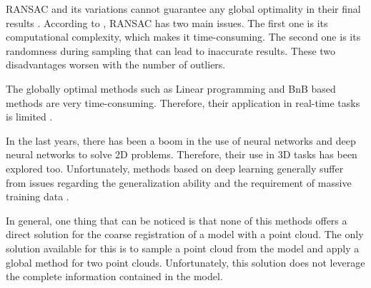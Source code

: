    RANSAC and its variations cannot guarantee any global optimality in their final results \cite{Bazin_2013_abranchandbound}.
    According to \cite{Quan_2020_com}, RANSAC has two main issues. 
    The first one is its computational complexity, which makes it time-consuming.
    The second one is its randomness during sampling that can lead to inaccurate results.
    These two disadvantages worsen with the number of outliers.

    The globally optimal methods such as Linear programming and BnB based methods are very time-consuming. 
    Therefore, their application in real-time tasks is limited \cite{Sarode_2019_oneframework}.

    In the last years, there has been a boom in the use of neural networks and deep neural networks to solve 2D problems.
    Therefore, their use in 3D tasks has been explored too.
    Unfortunately, methods based on deep learning generally suffer from issues regarding the generalization ability and the requirement of massive training data \cite{Quan_2020_com}.

    In general, one thing that can be noticed is that none of this methods offers a direct solution for the coarse registration of a model with a point cloud.
    The only solution available for this is to sample a point cloud from the model and apply a global method for two point clouds.
    Unfortunately, this solution does not leverage the complete information contained in the model.


